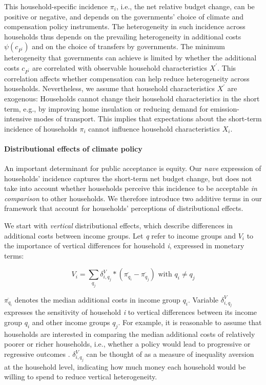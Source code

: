 \documentclass[12pt, a4paper]{article}
\begin{document}
This household-specific incidence $\pi_{i}$, i.e., the net relative budget change, can be positive or negative, and depends on the governments' choice of climate and compensation policy instruments. The heterogeneity in such incidence across households thus depends on the prevailing heterogeneity in additional costs $\psi(c_{P^{\prime}})$ and on the choice of transfers by governments. The minimum heterogeneity that governments can achieve is limited by whether the additional costs $c_{P^{\prime}}$ are correlated with observable household characteristics $X^{\prime}$. This correlation affects whether compensation can help reduce heterogeneity across households. Nevertheless, we assume that household characteristics $X^{\prime}$ are exogenous: Households cannot change their household characteristics in the short term, e.g., by improving home insulation or reducing demand for emission-intensive modes of transport. This implies that expectations about the short-term incidence of households $\pi_{i}$ cannot influence household characteristics $X_{i}$.

\paragraph{Distributional effects of climate policy}
An important determinant for public acceptance is equity. Our \textit{nave} expression of households' incidence captures the short-term net budget change, but does not take into account whether households perceive this incidence to be acceptable \textit{in comparison} to other households. We therefore introduce two additive terms in our framework that account for households' perceptions of distributional effects. 

We start with \textit{vertical} distributional effects, which describe differences in additional costs between income groups. Let \textit{q} refer to income groups and $V_{i}$ to the importance of vertical differences for household \textit{i}, expressed in monetary terms:

\begin{equation}\label{eq_V}
    V_{i} = \sum_{q_{j}} \delta_{i,q_{j}}^{V} * (\overline{\pi_{q_{i}}}-\overline{\pi_{q_{j}}}) \text{ with } q_{i} \neq q_{j}  
\end{equation}

$\overline{\pi_{q_{i}}}$ denotes the median additional costs in income group $q_{i}$. Variable $\delta_{i,q_{j}}^{V}$ expresses the sensitivity of household \textit{i} to vertical differences between its income group $q_{i}$ and other income groups $q_{j}$. For example, it is reasonable to assume that households are interested in comparing the median additional costs of relatively poorer or richer households, i.e., whether a policy would lead to progressive or regressive outcomes \autocite[e.g.,][]{Dechezlepretre.2022}. $\delta_{i,q_{j}}^{V}$ can be thought of as a measure of inequality aversion at the household level, indicating how much money each household would be willing to spend to reduce vertical heterogeneity.
\end{document}
